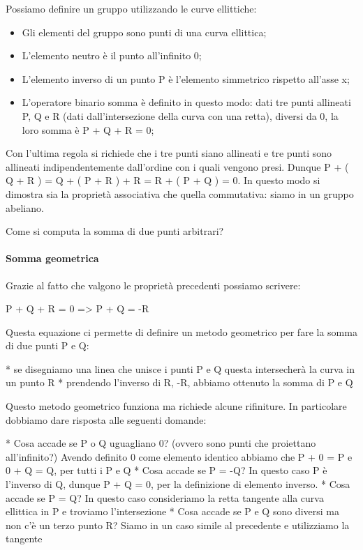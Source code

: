 \documentclass{book}
\theoremstyle{definition}
\begin{document}
Possiamo definire un gruppo utilizzando le curve ellittiche:

\begin{itemize}
    \item Gli elementi del gruppo sono punti di una curva ellittica;
    \item L'elemento neutro è il punto all'infinito 0;
    \item L'elemento inverso di un punto P è l'elemento simmetrico rispetto all'asse x;
    \item L'operatore binario somma è definito in questo modo: dati tre punti allineati P, Q e R (dati dall'intersezione della curva con una retta), diversi da 0, la loro somma è P + Q + R = 0;
\end{itemize}

Con l'ultima regola si richiede che i tre punti siano allineati e tre punti sono allineati indipendentemente dall'ordine con i quali vengono presi.
Dunque P + ( Q + R ) = Q + ( P + R ) + R = R + ( P + Q ) = 0. In questo modo si dimostra sia la proprietà associativa che quella commutativa: siamo in un gruppo abeliano.

Come si computa la somma di due punti arbitrari?

\paragraph{Somma geometrica}

Grazie al fatto che valgono le proprietà precedenti possiamo scrivere:

P + Q + R = 0 => P + Q = -R

Questa equazione ci permette di definire un metodo geometrico per fare la somma di due punti P e Q:

* se disegniamo una linea che unisce i punti P e Q questa intersecherà la curva in un punto R
* prendendo l'inverso di R, -R, abbiamo ottenuto la somma di P e Q

Questo metodo geometrico funziona ma richiede alcune rifiniture. In particolare dobbiamo dare risposta alle seguenti domande:

* Cosa accade se P o Q uguagliano 0? (ovvero sono punti che proiettano all'infinito?) Avendo definito 0 come elemento identico abbiamo che P + 0 = P e 0 + Q = Q, per tutti i P e Q
* Cosa accade se P = -Q? In questo caso P è l'inverso di Q, dunque P + Q = 0, per la definizione di elemento inverso.
* Cosa accade se P = Q? In questo caso consideriamo la retta tangente alla curva ellittica in P e troviamo l'intersezione
* Cosa accade se P e Q sono diversi ma non c'è un terzo punto R? Siamo in un caso simile al precedente e utilizziamo la tangente
\end{document}
